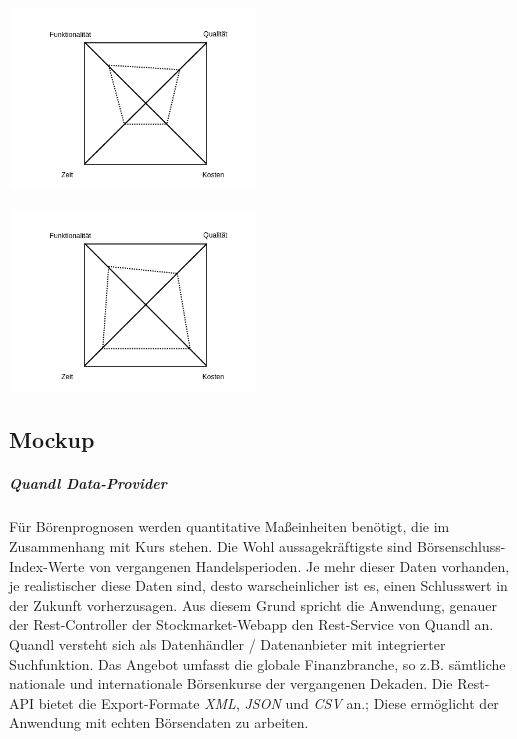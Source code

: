 \begin{minipage}[c]{0.5\textwidth}

\includegraphics[width=0.49\textwidth]{mag_viereck_not_linear.png}

\end{minipage}
\begin{minipage}[c]{0.5\textwidth}
\includegraphics[width=0.49\textwidth]{mag_viereck_linear.png}
\end{minipage}



\subsection{Mockup}
\label{subsection:Mockup} 

\subparagraph{Quandl Data-Provider}
Für Börenprognosen werden quantitative Maßeinheiten benötigt, die im Zusammenhang mit Kurs stehen. Die Wohl aussagekräftigste sind Börsenschluss-Index-Werte von vergangenen Handelsperioden. Je mehr dieser Daten vorhanden, je realistischer diese Daten sind, desto warscheinlicher ist es, einen Schlusswert in der Zukunft vorherzusagen. 
Aus diesem Grund spricht die Anwendung, genauer der Rest-Controller der Stockmarket-Webapp den Rest-Service von Quandl an.  
Quandl versteht sich als Datenhändler / Datenanbieter mit integrierter Suchfunktion. Das Angebot umfasst die globale Finanzbranche, so z.B. sämtliche nationale und internationale Börsenkurse der vergangenen Dekaden. 
Die Rest-API bietet die Export-Formate \emph{XML}, \emph{JSON} und \emph{CSV} an.\linebreak; 
Diese ermöglicht der Anwendung mit echten Börsendaten zu arbeiten. 

